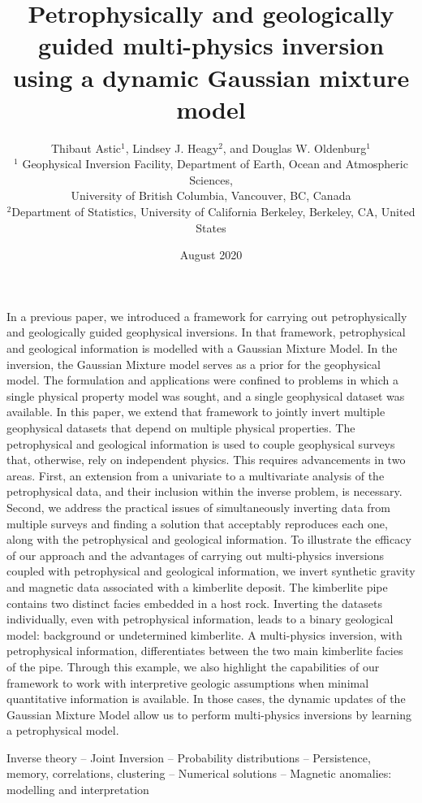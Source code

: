 \documentclass[extra, mreferee]{gji_joint} %
\title[Multi-physics PGI]
  {Petrophysically and geologically guided multi-physics inversion using a dynamic Gaussian mixture model}
\author[Thibaut Astic, Lindsey J. Heagy and Douglas W. Oldenburg]
  {Thibaut Astic$^1$, Lindsey J. Heagy$^2$, and Douglas W. Oldenburg$^1$\\
  $^1$ Geophysical Inversion Facility, Department of Earth, Ocean and Atmospheric Sciences,\\University of British Columbia, Vancouver, BC, Canada\\
  $^2$Department of Statistics, University of California Berkeley, Berkeley, CA, United States
  }
\date{August 2020}
\begin{document}
\label{firstpage}

\maketitle

\begin{summary}
In a previous paper, we introduced a framework for carrying out petrophysically and geologically guided geophysical inversions. In that framework, petrophysical and geological information is modelled with a Gaussian Mixture Model. In the inversion, the Gaussian Mixture model serves as a prior for the geophysical model. The formulation and applications were confined to problems in which a single physical property model was sought, and a single geophysical dataset was available. In this paper, we extend that framework to jointly invert multiple geophysical datasets that depend on multiple physical properties. The petrophysical and geological information is used to couple geophysical surveys that, otherwise, rely on independent physics. This requires advancements in two areas. First, an extension from a univariate to a multivariate analysis of the petrophysical data, and their inclusion within the inverse problem, is necessary. Second, we address the practical issues of simultaneously inverting data from multiple surveys and finding a solution that acceptably reproduces each one, along with the petrophysical and geological information. To illustrate the efficacy of our approach and the advantages of carrying out multi-physics inversions coupled with petrophysical and geological information, we invert synthetic gravity and magnetic data associated with a kimberlite deposit. The kimberlite pipe contains two distinct facies embedded in a host rock. Inverting the datasets individually, even with petrophysical information, leads to a binary geological model: background or undetermined kimberlite. A multi-physics inversion, with petrophysical information, differentiates between the two main kimberlite facies of the pipe. Through this example, we also highlight the capabilities of our framework to work with interpretive geologic assumptions when minimal quantitative information is available. In those cases, the dynamic updates of the Gaussian Mixture Model allow us to perform multi-physics inversions by learning a petrophysical model.

\end{summary}

\begin{keywords}
Inverse theory -- Joint Inversion -- Probability distributions -- Persistence, memory, correlations, clustering -- Numerical solutions -- Magnetic anomalies: modelling and interpretation
\end{keywords}
\end{document}
